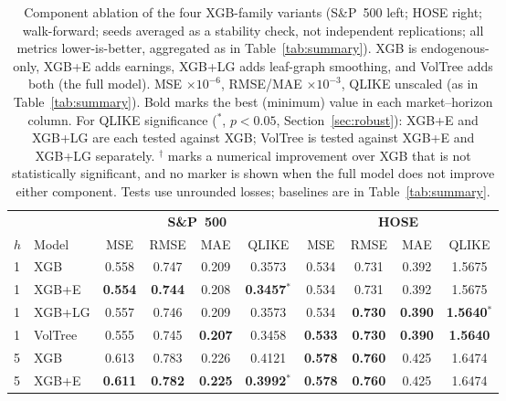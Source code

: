\documentclass[runningheads,a4paper]{llncs}
\begin{document}
\begin{table}[!t]
\centering
\caption{Component ablation of the four XGB-family variants (S\&P~500 left; HOSE
right; walk-forward; seeds averaged as a stability check, not independent replications; all metrics
lower-is-better, aggregated as in Table~\ref{tab:summary}). XGB is endogenous-only, XGB+E adds earnings,
XGB+LG adds leaf-graph smoothing, and VolTree adds both (the full model).
MSE $\times10^{-6}$, RMSE/MAE $\times10^{-3}$, QLIKE unscaled (as in Table~\ref{tab:summary}). Bold marks
the best (minimum) value in each market--horizon column. For QLIKE significance ($^{*}$, $p<0.05$, Section~\ref{sec:robust}): XGB+E
and XGB+LG are each tested against XGB; VolTree is tested against XGB+E and XGB+LG separately. $^{\dagger}$
marks a numerical improvement over XGB that is not statistically significant, and no marker is shown
when the full model does not improve either component. Tests use unrounded losses; baselines are in
Table~\ref{tab:summary}.}
\label{tab:detail}
\scriptsize
\setlength{\tabcolsep}{3pt}
\begin{tabular}{ll cccc cccc}
\toprule
& & \multicolumn{4}{c}{\textbf{S\&P~500}} & \multicolumn{4}{c}{\textbf{HOSE}} \\
\cmidrule(lr){3-6}\cmidrule(lr){7-10}
$h$ & Model & MSE & RMSE & MAE & QLIKE & MSE & RMSE & MAE & QLIKE \\
\midrule
1 & XGB      & 0.558 & 0.747 & 0.209 & 0.3573 & 0.534 & 0.731 & 0.392 & 1.5675 \\
1 & XGB+E    & \textbf{0.554} & \textbf{0.744} & 0.208 & \textbf{0.3457$^{*}$} & 0.534 & 0.731 & 0.392 & 1.5675 \\
1 & XGB+LG   & 0.557 & 0.746 & 0.209 & 0.3573 & 0.534 & \textbf{0.730} & \textbf{0.390} & \textbf{1.5640$^{*}$} \\
1 & VolTree  & 0.555 & 0.745 & \textbf{0.207} & 0.3458 & \textbf{0.533} & \textbf{0.730} & \textbf{0.390} & \textbf{1.5640} \\
\midrule
5 & XGB      & 0.613 & 0.783 & 0.226 & 0.4121 & \textbf{0.578} & \textbf{0.760} & 0.425 & 1.6474 \\
5 & XGB+E    & \textbf{0.611} & \textbf{0.782} & \textbf{0.225} & \textbf{0.3992$^{*}$} & \textbf{0.578} & \textbf{0.760} & 0.425 & 1.6474 \\

\end{tabular}
\end{table}
\end{document}
